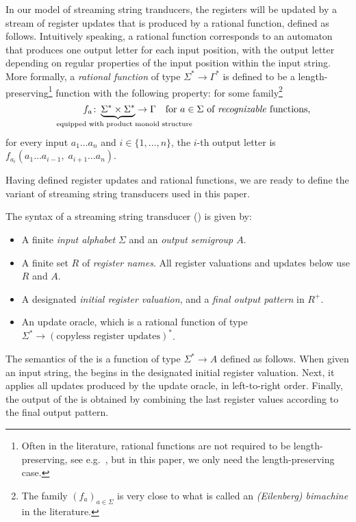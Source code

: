 In our model of streaming string tranducers, the registers will be updated by a
stream of register updates that is produced by a {rational function}, defined as
follows. Intuitively speaking, a rational function corresponds to an automaton
that produces one output letter for each input position, with the output letter
depending on regular properties of the input position within the input string.
More formally, a \emph{rational function} of type $\Sigma^* \to \Gamma^*$ is
defined to be a length-preserving\footnote{Often in the literature, rational
  functions are not required to be length-preserving, see
  e.g.~\cite[p.~525]{sakarovitch2009elements}, but in this paper, we only need
  the length-preserving case.} function with the following property: for some family\footnote{The family $(f_a)_{a\in\Sigma}$ is very close to what is called an \emph{(Eilenberg) bimachine} in the literature.}
\[ \qquad\qquad f_a \colon \myunderbrace{\Sigma^* \times \Sigma^*}{\qquad equipped with product monoid structure} \to \Gamma\quad \text{for $a \in \Sigma$ of \emph{recognizable} functions,} \]
for every input $a_1 \dots a_n$ and $i\in\{1,\dots,n\}$, the $i$-th output letter is $f_{a_i}(a_1 \dots a_{i-1},\; a_{i+1} \dots a_n)$.

  Having defined register updates and rational functions, we are ready to define the variant of streaming string transducers used in this paper.

\begin{definition}\label{def:usual-sst}
    The syntax of a streaming string transducer (\sst) is given by:
\begin{itemize}
    \item A finite \emph{input alphabet} $\Sigma$ and an \emph{output semigroup $A$}.
    \item A finite set $R$ of \emph{register names}. All register valuations and updates below use $R$ and $A$.
    \item A designated \emph{initial register valuation}, and a \emph{final output pattern} in $R^+$.
    \item An update oracle, which is a rational function of type 
        $\Sigma^* \to (\text{copyless register updates})^*$.
\end{itemize}
\end{definition}
The semantics of the \sst{} is a function of type $\Sigma^* \to A$ defined as follows. When given an input string, the \sst{} begins in the designated initial register valuation. Next, it applies all updates produced by the update oracle, in left-to-right order. Finally, the output of the \sst{} is obtained by combining the last register values according to the final output pattern.

